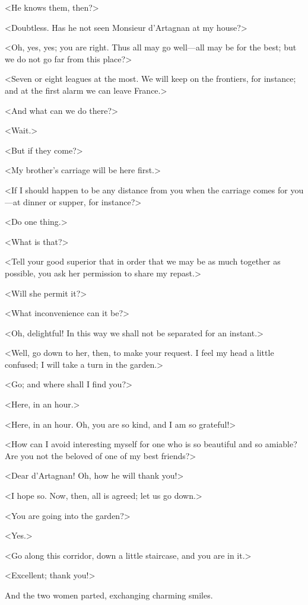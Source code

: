 <He knows them, then?> 

<Doubtless. Has he not seen Monsieur d'Artagnan at my house?> 

<Oh, yes, yes; you are right. Thus all may go well---all may be for the best; but we do not go far from this place?> 

<Seven or eight leagues at the most. We will keep on the frontiers, for instance; and at the first alarm we can leave France.> 

<And what can we do there?> 

<Wait.> 

<But if they come?> 

<My brother's carriage will be here first.> 

<If I should happen to be any distance from you when the carriage comes for you---at dinner or supper, for instance?> 

<Do one thing.> 

<What is that?> 

<Tell your good superior that in order that we may be as much together as possible, you ask her permission to share my repast.> 

<Will she permit it?> 

<What inconvenience can it be?> 

<Oh, delightful! In this way we shall not be separated for an instant.> 

<Well, go down to her, then, to make your request. I feel my head a little confused; I will take a turn in the garden.> 

<Go; and where shall I find you?> 

<Here, in an hour.> 

<Here, in an hour. Oh, you are so kind, and I am so grateful!> 

<How can I avoid interesting myself for one who is so beautiful and so amiable? Are you not the beloved of one of my best friends?> 

<Dear d'Artagnan! Oh, how he will thank you!> 

<I hope so. Now, then, all is agreed; let us go down.> 

<You are going into the garden?> 

<Yes.> 

<Go along this corridor, down a little staircase, and you are in it.> 

<Excellent; thank you!> 

And the two women parted, exchanging charming smiles. 

